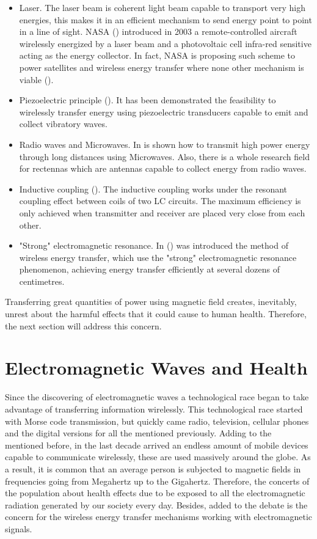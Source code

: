 \documentclass{intech}
\begin{document}
\begin{itemize}
\item Laser. The laser beam is coherent light beam capable to transport very high energies, this makes it in an efficient mechanism to send energy point to point in a line of sight. NASA (\cite{RES21}) introduced in 2003 a remote-controlled aircraft wirelessly energized by a laser beam and a photovoltaic cell infra-red sensitive acting as the energy collector. In fact, NASA is proposing such scheme to power satellites and wireless energy transfer where none other mechanism is viable (\cite{RES21}). 
\item Piezoelectric principle (\cite{RES8}). It has been demonstrated the feasibility to wirelessly transfer energy using piezoelectric transducers capable to emit and collect vibratory waves.
\item Radio waves and Microwaves. In \cite{RES22} is shown how to transmit high power energy through long distances using Microwaves. Also, there is a whole research field for rectennas \cite{RES4,RES9,RES10,RES12} which are antennas capable to collect energy from radio waves.
\item Inductive coupling (\cite{RES3,RES5,RES6,RES7}). The inductive coupling works under the resonant coupling effect between coils of two LC circuits. The maximum efficiency is only achieved when transmitter and receiver are placed very close from each other.
\item "Strong" electromagnetic resonance. In (\cite{RES1,RES2}) was introduced the method of wireless energy transfer, which use the "strong" electromagnetic resonance phenomenon, achieving energy transfer efficiently at several dozens of centimetres. 
\end{itemize}

Transferring great quantities of power using magnetic field creates, inevitably, unrest about the harmful effects that it could cause to human health. Therefore, the next section will address this concern.

\section{Electromagnetic Waves and Health}

Since the discovering of electromagnetic waves a technological race began to take advantage of transferring information wirelessly. This technological race started with Morse code transmission, but quickly came radio, television, cellular phones and the digital versions for all the mentioned previously. Adding to the mentioned before, in the last decade arrived an endless amount of mobile devices capable to communicate wirelessly, these are used massively around the globe. As a result, it is common that an average person is  subjected to magnetic fields in frequencies going from Megahertz up to the Gigahertz. Therefore, the concerts of the population about health effects due to be exposed to all the  electromagnetic radiation generated by our society every day. Besides, added to the debate is the concern for the wireless energy transfer mechanisms working with electromagnetic signals.
\end{document}
